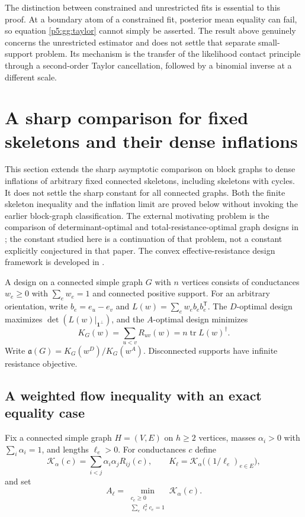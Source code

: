 \documentclass[11pt,a4paper]{article}
\theoremstyle{definition}
\theoremstyle{remark}
\numberwithin{equation}{section}
\begin{document}
The distinction between constrained and unrestricted fits is
essential to this proof.  At a boundary atom of a constrained fit,
posterior mean equality can fail, so equation \eqref{p5:gg:taylor}
cannot simply be asserted.  The result above genuinely concerns
the unrestricted estimator and does not settle that separate
small-support problem.  Its mechanism is the transfer of the
likelihood contact principle through a second-order Taylor
cancellation, followed by a binomial inverse at a different scale.



\section{A sharp comparison for fixed skeletons and their dense inflations}
\label{p5:sec:skel-inflation}

This section extends the sharp asymptotic comparison on block graphs
to dense inflations of arbitrary fixed connected skeletons, including
skeletons with cycles.  It does not settle the sharp constant for all
connected graphs.  Both the finite skeleton inequality and the
inflation limit are proved below without invoking the earlier
block-graph classification.  The external motivating problem is the comparison
of determinant-optimal and total-resistance-optimal graph designs in
\cite{p2:SulimanWeinstein2023}; the constant studied here is a continuation
of that problem, not a constant explicitly conjectured in that paper.
The convex effective-resistance design framework is developed in
\cite{p5:GBS2008}.

A design on a connected simple graph $G$ with $n$ vertices consists of
conductances $w_e\geq0$ with $\sum_e w_e=1$ and connected positive
support.  For an arbitrary orientation, write
$b_e=e_u-e_v$ and $L(w)=\sum_e w_e b_eb_e^{\mathsf T}$.
The $D$-optimal design maximizes
$\det(L(w)|_{\mathbf1^\perp})$, and the $A$-optimal design minimizes
\[
 K_G(w)=\sum_{u<v}R_{uv}(w)
       =n\operatorname{tr}L(w)^\dagger.
\]
Write $\mathfrak a(G)=K_G(w^D)/K_G(w^A)$.
Disconnected supports have infinite resistance objective.

\subsection{A weighted flow inequality with an exact equality case}

Fix a connected simple graph $H=(V,E)$ on $h\geq2$ vertices, masses
$\alpha_i>0$ with $\sum_i\alpha_i=1$, and lengths $\ell_e>0$.
For conductances $c$ define
\[
 \mathcal K_\alpha(c)=\sum_{i<j}\alpha_i\alpha_j R_{ij}(c),
 \qquad
 K_\ell=\mathcal K_\alpha\bigl((1/\ell_e)_{e\in E}\bigr),
\]
and set
\begin{equation}\label{p5:eq:skel-A}
 A_\ell=\min_{\substack{c_e\geq0\\\sum_e\ell_e^2c_e=1}}
              \mathcal K_\alpha(c).
\end{equation}
\end{document}
